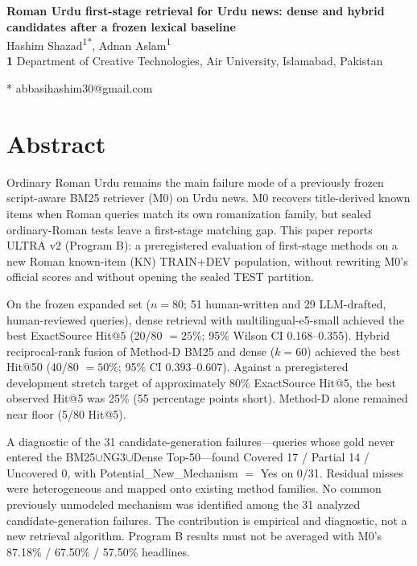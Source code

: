 \documentclass[10pt,letterpaper]{article}
\begin{document}
\vspace*{0.2in}

\begin{flushleft}
{\Large
\textbf{Roman {Urdu} first-stage retrieval for {Urdu} news: dense and hybrid candidates after a frozen lexical baseline}
}
\newline
\\
Hashim Shazad\textsuperscript{1*},
Adnan Aslam\textsuperscript{1}
\\
\bigskip
\textbf{1} Department of Creative Technologies, Air University, Islamabad, Pakistan
\\
\bigskip

* abbasihashim30@gmail.com

\end{flushleft}

\section*{Abstract}
Ordinary Roman Urdu remains the main failure mode of a previously frozen script-aware BM25 retriever (M0) on Urdu news. M0 recovers title-derived known items when Roman queries match its own romanization family, but sealed ordinary-Roman tests leave a first-stage matching gap. This paper reports ULTRA v2 (Program B): a preregistered evaluation of first-stage methods on a new Roman known-item (KN) TRAIN+DEV population, without rewriting M0's official scores and without opening the sealed TEST partition.

On the frozen expanded set ($n = 80$; 51 human-written and 29 LLM-drafted, human-reviewed queries), dense retrieval with multilingual-e5-small achieved the best ExactSource Hit@5 (20/80 $= 25\%$; 95\% Wilson CI 0.168--0.355). Hybrid reciprocal-rank fusion of Method-D BM25 and dense ($k = 60$) achieved the best Hit@50 (40/80 $= 50\%$; 95\% CI 0.393--0.607). Against a preregistered development stretch target of approximately 80\% ExactSource Hit@5, the best observed Hit@5 was 25\% (55 percentage points short). Method-D alone remained near floor (5/80 Hit@5).

A diagnostic of the 31 candidate-generation failures---queries whose gold never entered the BM25$\cup$NG3$\cup$Dense Top-50---found Covered 17 / Partial 14 / Uncovered 0, with Potential\_New\_Mechanism $=$ Yes on 0/31. Residual misses were heterogeneous and mapped onto existing method families. No common previously unmodeled mechanism was identified among the 31 analyzed candidate-generation failures. The contribution is empirical and diagnostic, not a new retrieval algorithm. Program B results must not be averaged with M0's 87.18\% / 67.50\% / 57.50\% headlines.
\end{document}
